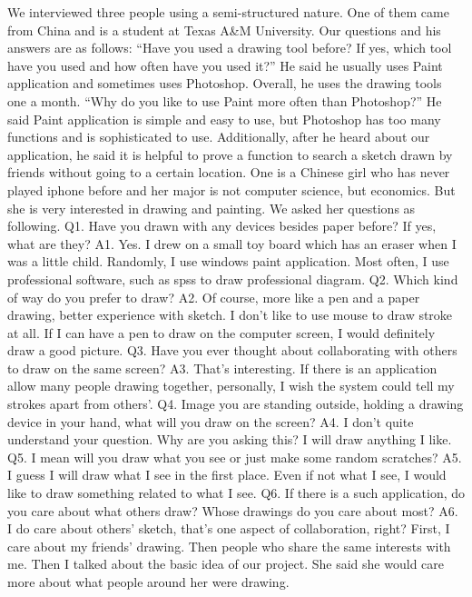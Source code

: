 \documentclass{www2010-submission}
\begin{document}
We interviewed three people using a semi-structured nature. One of them came from China and is a student at Texas A\&M University. Our questions and his answers are as follows: ``Have you used a drawing tool before? If yes, which tool have you used and how often have you used it?'' He said he usually uses Paint application and sometimes uses Photoshop.  Overall, he uses the drawing tools one a month. ``Why do you like to use Paint more often than Photoshop?'' He said Paint application is simple and easy to use, but Photoshop has too many functions and is sophisticated to use. Additionally, after he heard about our application, he said it is helpful to prove a function to search a sketch drawn by friends without going to a certain location. One is a Chinese girl who has never played iphone before and her major is not computer science, but economics. But she is very interested in drawing and painting. We asked her questions as following. Q1. Have you drawn with any devices besides paper before? If yes, what are they? A1. Yes. I drew on a small toy board which has an eraser when I was a little child. Randomly, I use windows paint application. Most often, I use professional software, such as spss to draw professional diagram. Q2. Which kind of way do you prefer to draw? A2. Of course, more like a pen and a paper drawing, better experience with sketch. I don't like to use mouse to draw stroke at all. If I can have a pen to draw on the computer screen, I would definitely draw a good picture. Q3. Have you ever thought about collaborating with others to draw on the same screen? A3. That's interesting. If there is an application allow many people drawing together, personally, I wish the system could tell my strokes apart from others'. Q4. Image you are standing outside, holding a drawing device in your hand, what will you draw on the screen? A4. I don't quite understand your question. Why are you asking this? I will draw anything I like. Q5. I mean will you draw what you see or just make some random scratches? A5. I guess I will draw what I see in the first place. Even if not what I see, I would like to draw something related to what I see. Q6. If there is a such application, do you care about what others draw? Whose drawings do you care about most? A6. I do care about others' sketch, that's one aspect of collaboration, right? First, I care about my friends' drawing. Then people who share the same interests with me. Then I talked about the basic idea of our project. She said she would care more about what people around her were drawing.
\end{document}
